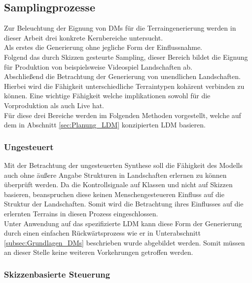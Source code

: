 \subsection {Samplingprozesse}

Zur Beleuchtung der Eignung von DMs für die Terraingenerierung werden in dieser Arbeit drei konkrete Kernbereiche untersucht. \\
Als erstes die Generierung ohne jegliche Form der Einflussnahme. \\
Folgend das durch Skizzen gesteurte Sampling, dieser Bereich bildet die Eignung für Produktion von beispielsweise Videospiel Landschaften ab. \\
Abschließend die Betrachtung der Generierung von unendlichen Landschaften. Hierbei wird die Fähigkeit unterschiedliche Terraintypen kohärent verbinden zu können. Eine wichtige Fähigkeit welche implikationen sowohl für die Vorproduktion als auch Live hat. \\
Für diese drei Bereiche werden im Folgenden Methoden vorgestellt, welche auf dem in Abschnitt \ref{sec:Planung_LDM} konzipierten LDM basieren. 


\subsubsection {Ungesteuert}

Mit der Betrachtung der ungesteuerten Synthese soll die Fähigkeit des Modells auch ohne äußere Angabe Strukturen in Landschaften erlernen zu können überprüft werden. Da die Kontrollsignale auf Klassen und nicht auf Skizzen basieren, beanspruchen diese keinen Menschengesteueren Einfluss auf die Struktur der Landschaften. Somit wird die Betrachtung ihres Einflusses auf die erlernten Terrains in diesen Prozess eingeschlossen. \\
Unter Anwendung auf das spezifizierte LDM kann diese Form der Generierung durch einen einfachen Rückwärtsprozess wie er in Unterabschnitt \ref{subsec:Grundlagen_DMs} beschrieben wurde abgebildet werden. Somit müssen an dieser Stelle keine weiteren Vorkehrungen getroffen werden. 



\subsubsection {Skizzenbasierte Steuerung}

